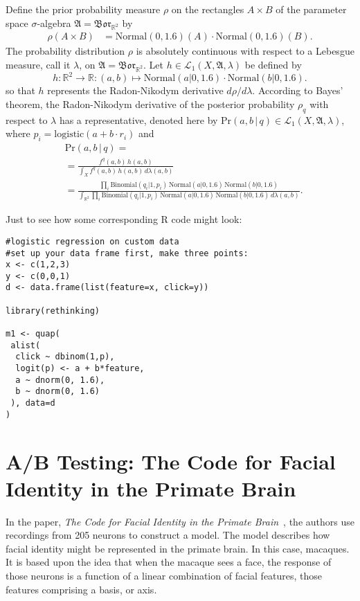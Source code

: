 \documentclass[
twoside=true,
paper=letter,
fontsize=9pt,
pagesize=auto,
leqno,
openany,
headsepline,
overfullrule,
]{scrbook}
\theoremstyle{plain}
\theoremstyle{plain}
\theoremstyle{definition}
\theoremstyle{bfnoteitalic}
\theoremstyle{bfnoteroman}
\newcommand{\sigalg}[1]{\mathfrak{#1}}
\newcommand{\cali}[1]{\mathscr{#1}}
\newcommand{\borel}{\mathfrak{Bor}}
\newcommand{\textsigma}{\hbox{\large{$\sigma$}}\kern-1pt}
\newcommand{\R}{\mathbb{R}}
\newcommand{\function}{f}
\newcommand{\functioniii}{h}
\newcommand{\measurespace}{X}
\newcommand{\seti}{A}
\newcommand{\setii}{B}
\newcommand{\pspace}{\measurespace}%
\newcommand{\pspacesig}{\sigalg{A}}
\begin{document}
Define the prior probability measure $\rho$ on the rectangles
$\seti\times\setii$ of the parameter space \textsigma-algebra
$\pspacesig=\borel_{\R^2}$ by
\begin{align*}
\rho(\seti\times\setii)
&=
\text{Normal}(0,1.6)(\seti)\cdot
\text{Normal}(0,1.6)(\setii).
\end{align*}
The probability distribution $\rho$ is absolutely continuous with respect to a Lebesgue measure, call it
$\lambda$, on $\pspacesig=\borel_{\R^2}$.
Let $\functioniii\in\cali{L}_1(\pspace,\pspacesig,\lambda)$ be defined by
\[
\functioniii:\R^2\to\R:(a,b)\mapsto
\text{Normal}(a\vert 0,1.6)\cdot
\text{Normal}(b\vert 0,1.6).
\]
so that $\functioniii$ represents the Radon-Nikodym derivative $d\rho/d\lambda$.
According to Bayes' theorem, the Radon-Nikodym derivative of the posterior probability
$\rho_{q}$ with respect to $\lambda$ has a representative, denoted here by
$\text{Pr}(a,b\,\vert\, q)\in\cali{L}_1(\pspace, \pspacesig,\lambda)$,
where $p_i=\text{logistic}(a + b\cdot r_i)$ and
\begin{align*}
&\text{Pr}(a,b\,\vert\, q) =
\\
& =
\frac{\function^{q}(a,b)\,\functioniii(a,b)}
{\int_{\pspace}\function^{q}(a,b)\,\functioniii(a,b)\,d\lambda(a,b)} \\
& =
\frac{
\prod_i
\text{Binomial}(q_i \vert 1, p_i)\,
\text{Normal}(a\vert 0,1.6)\,
\text{Normal}(b\vert 0,1.6)}
{\int_{\R^2}
\prod_i \text{Binomial}(q_i \vert 1, p_i)\,
\text{Normal}(a\vert 0,1.6)\,
\text{Normal}(b\vert 0,1.6)
\,d\lambda(a,b)}.
\end{align*}

Just to see how some corresponding R code might look:
\begin{rcode}[threepoint]
\begin{lstlisting}
#logistic regression on custom data
#set up your data frame first, make three points:
x <- c(1,2,3)
y <- c(0,0,1)
d <- data.frame(list(feature=x, click=y))

library(rethinking)

m1 <- quap(
 alist(
  click ~ dbinom(1,p),
  logit(p) <- a + b*feature,
  a ~ dnorm(0, 1.6),
  b ~ dnorm(0, 1.6)
 ), data=d
)
\end{lstlisting}
\end{rcode}


\section{A/B Testing: The Code for Facial Identity in the Primate Brain}
In the paper, \textsl{The Code for Facial Identity in the Primate Brain}~\cite{tcffiitpb_chang_2017}, the authors use recordings from 205 neurons to construct a model. The model describes how facial identity might be represented in the primate brain. In this case, macaques. It is based upon the idea that when the macaque sees a face, the response of those neurons is a function of a linear combination of facial features, those features comprising a basis, or axis.
\end{document}
